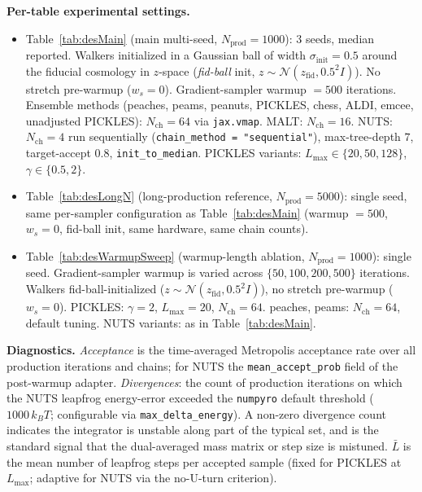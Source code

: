 \documentclass{article}
\newcommand{\gN}{\mathcal{N}}
\begin{document}
\textbf{Per-table experimental settings.}
\begin{itemize}\setlength\itemsep{2pt}
\item Table~\ref{tab:desMain} (main multi-seed, $N_{\text{prod}} = 1000$):
$3$ seeds, median reported.  Walkers initialized in a Gaussian ball of
width $\sigma_{\text{init}} = 0.5$ around the fiducial cosmology in
$z$-space (\emph{fid-ball} init, $z \sim \gN(z_{\text{fid}}, 0.5^2 I)$).
No stretch pre-warmup ($w_s = 0$).  Gradient-sampler warmup $=500$
iterations.  Ensemble methods (peaches, peams, peanuts, PICKLES, chess,
ALDI, emcee, unadjusted PICKLES): $N_{\text{ch}} = 64$ via
\texttt{jax.vmap}.  MALT: $N_{\text{ch}} = 16$.  NUTS: $N_{\text{ch}} = 4$
run sequentially (\texttt{chain\_method = "sequential"}), max-tree-depth $7$,
target-accept $0.8$, \texttt{init\_to\_median}.  PICKLES variants:
$L_{\max} \in \{20, 50, 128\}$, $\gamma \in \{0.5, 2\}$.

\item Table~\ref{tab:desLongN} (long-production reference,
$N_{\text{prod}} = 5000$): single seed, same per-sampler configuration
as Table~\ref{tab:desMain} (warmup $= 500$, $w_s = 0$, fid-ball init,
same hardware, same chain counts).

\item Table~\ref{tab:desWarmupSweep} (warmup-length ablation,
$N_{\text{prod}} = 1000$): single seed.  Gradient-sampler warmup is
varied across $\{50, 100, 200, 500\}$ iterations.  Walkers
fid-ball-initialized ($z \sim \gN(z_{\text{fid}}, 0.5^2 I)$), no stretch
pre-warmup ($w_s = 0$).  PICKLES: $\gamma = 2$, $L_{\max} = 20$,
$N_{\text{ch}} = 64$.  peaches, peams: $N_{\text{ch}} = 64$, default
tuning.  NUTS variants: as in Table~\ref{tab:desMain}.

\end{itemize}

\textbf{Diagnostics.}  \emph{Acceptance} is the time-averaged Metropolis
acceptance rate over all production iterations and chains; for NUTS the
\texttt{mean\_accept\_prob} field of the post-warmup adapter.
\emph{Divergences}: the count of production iterations on which the NUTS
leapfrog energy-error exceeded the \texttt{numpyro} default threshold
($1000\,k_B T$; configurable via \texttt{max\_delta\_energy}).  A non-zero
divergence count indicates the integrator is unstable along part of the
typical set, and is the standard signal that the dual-averaged mass
matrix or step size is mistuned.  $\bar L$ is the mean number of
leapfrog steps per accepted sample (fixed for PICKLES at $L_{\max}$;
adaptive for NUTS via the no-U-turn criterion).


% 
\end{document}
